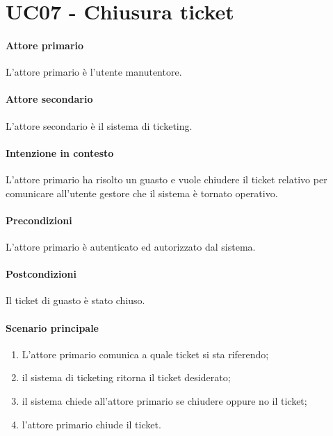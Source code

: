 \section{UC07 - Chiusura ticket}

\paragraph{Attore primario} L'attore primario è l'utente manutentore.
\paragraph{Attore secondario} L'attore secondario è il sistema di ticketing.
\paragraph{Intenzione in contesto} L'attore primario ha risolto un guasto e vuole chiudere il ticket relativo per comunicare all'utente gestore che il sistema è tornato operativo.

\paragraph{Precondizioni} L'attore primario è autenticato ed autorizzato dal sistema.

\paragraph{Postcondizioni} Il ticket di guasto è stato chiuso.

\paragraph{Scenario principale}

\begin{enumerate}
    \item L'attore primario comunica a quale ticket si sta riferendo;
    \item il sistema di ticketing ritorna il ticket desiderato;
    \item il sistema chiede all'attore primario se chiudere oppure no il ticket;
    \item l'attore primario chiude il ticket.
\end{enumerate}

